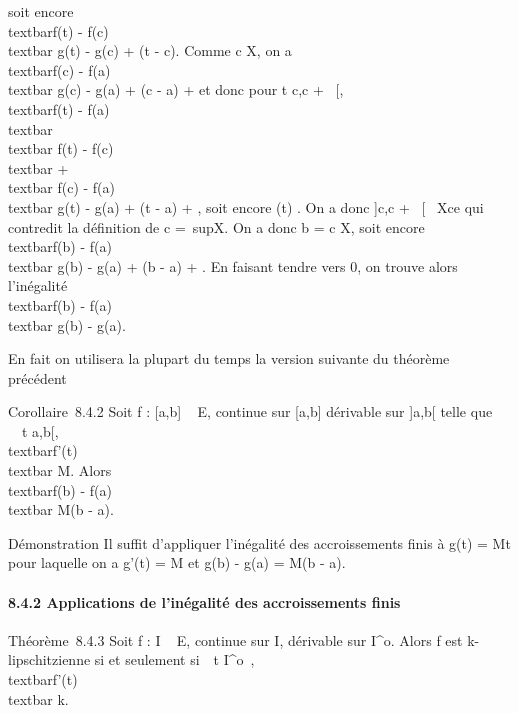 soit encore \\textbar{}f(t) -
f(c)\\textbar{} \leq g(t) - g(c) + \epsilon(t - c). Comme c \in
X\epsilon, on a \\textbar{}f(c) -
f(a)\\textbar{} \leq g(c) - g(a) + \epsilon(c - a) + \epsilon et donc pour
t \in{]}c,c + \alpha~{[}, \\textbar{}f(t) -
f(a)\\textbar{} \leq\\textbar{} f(t) -
f(c)\\textbar{} +\\textbar{} f(c) -
f(a)\\textbar{} \leq g(t) - g(a) + \epsilon(t - a) + \epsilon, soit encore
\phi\epsilon(t) \leq \epsilon. On a donc {]}c,c + \alpha~{[}\subset~ X\epsilon ce qui
contredit la définition de c =\
supX\epsilon. On a donc b = c \in X\epsilon, soit encore
\\textbar{}f(b) - f(a)\\textbar{} \leq g(b) -
g(a) + \epsilon(b - a) + \epsilon. En faisant tendre \epsilon vers 0, on trouve alors
l'inégalité \\textbar{}f(b) -
f(a)\\textbar{} \leq g(b) - g(a).

En fait on utilisera la plupart du temps la version suivante du théorème
précédent

Corollaire~8.4.2 Soit f : {[}a,b{]} \rightarrow~ E, continue sur {[}a,b{]}
dérivable sur {]}a,b{[} telle que \forall~~t
\in{]}a,b{[}, \\textbar{}f'(t)\\textbar{} \leq
M. Alors \\textbar{}f(b) - f(a)\\textbar{}
\leq M(b - a).

Démonstration Il suffit d'appliquer l'inégalité des accroissements finis
à g(t) = Mt pour laquelle on a g'(t) = M et g(b) - g(a) = M(b - a).

\paragraph{8.4.2 Applications de l'inégalité des accroissements finis}

Théorème~8.4.3 Soit f : I \rightarrow~ E, continue sur I, dérivable sur
I^o. Alors f est k-lipschitzienne si et seulement
si~\forall~t \in I^o~,
\\textbar{}f'(t)\\textbar{} \leq k.


